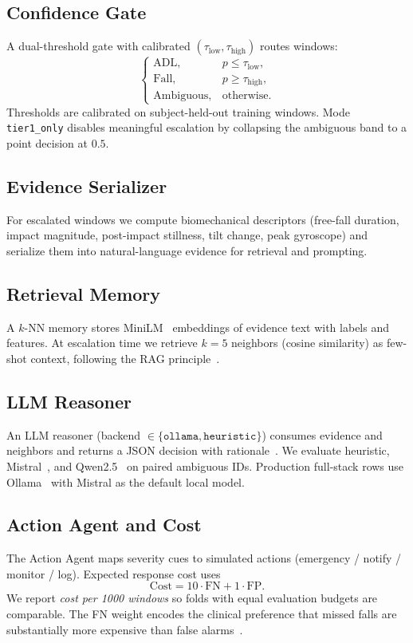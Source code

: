 \documentclass[journal]{IEEEtran}
\begin{document}
\subsection{Confidence Gate}
A dual-threshold gate with calibrated $(\tau_{\mathrm{low}},\tau_{\mathrm{high}})$ routes windows:
\begin{equation}
\begin{cases}
\mathrm{ADL}, & p \le \tau_{\mathrm{low}},\\
\mathrm{Fall}, & p \ge \tau_{\mathrm{high}},\\
\mathrm{Ambiguous}, & \text{otherwise.}
\end{cases}
\end{equation}
Thresholds are calibrated on subject-held-out training windows. Mode \texttt{tier1\_only} disables meaningful escalation by collapsing the ambiguous band to a point decision at $0.5$.

\subsection{Evidence Serializer}
For escalated windows we compute biomechanical descriptors (free-fall duration, impact magnitude, post-impact stillness, tilt change, peak gyroscope) and serialize them into natural-language evidence for retrieval and prompting.

\subsection{Retrieval Memory}
A $k$-NN memory stores MiniLM~\cite{minilm2020} embeddings of evidence text with labels and features. At escalation time we retrieve $k{=}5$ neighbors (cosine similarity) as few-shot context, following the RAG principle~\cite{lewis2020rag}.

\subsection{LLM Reasoner}
An LLM reasoner (backend $\in\{\texttt{ollama},\texttt{heuristic}\}$) consumes evidence and neighbors and returns a JSON decision with rationale~\cite{wei2022cot}. We evaluate heuristic, Mistral~\cite{mistral2023}, and Qwen2.5~\cite{qwen2024} on paired ambiguous IDs. Production full-stack rows use Ollama~\cite{ollama} with Mistral as the default local model.

\subsection{Action Agent and Cost}
The Action Agent maps severity cues to simulated actions (emergency / notify / monitor / log). Expected response cost uses
\begin{equation}
\mathrm{Cost} = 10\cdot \mathrm{FN} + 1\cdot \mathrm{FP}.
\end{equation}
We report \emph{cost per 1000 windows} so folds with equal evaluation budgets are comparable. The FN weight encodes the clinical preference that missed falls are substantially more expensive than false alarms~\cite{elkan2001foundations}.
\end{document}
